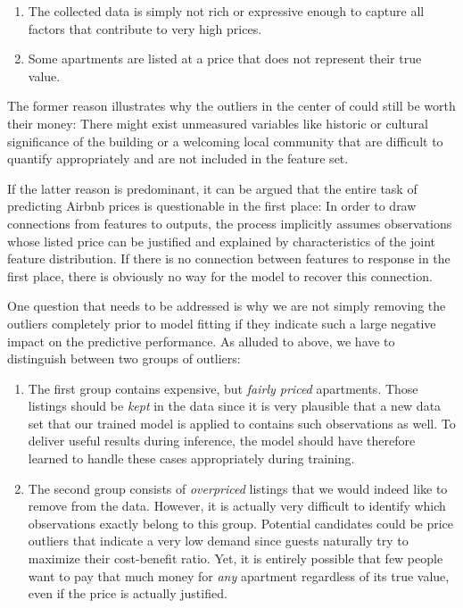 \begin{enumerate}
  \item The collected data is simply not rich or expressive enough to capture all factors that contribute to very high prices.
  \item Some apartments are listed at a price that does not represent their true value.
\end{enumerate}


The former reason illustrates why the outliers in the center of  could still be worth their money:
There might exist unmeasured variables like historic or cultural significance of the building or a welcoming local community that are difficult to quantify appropriately and are not included in the feature set.

If the latter reason is predominant, it can be argued that the entire task of predicting Airbnb prices is questionable in the first place:
In order to draw connections from features to outputs, the process implicitly assumes observations whose listed price can be justified and explained by characteristics of the joint feature distribution.
If there is no connection between features to response in the first place, there is obviously no way for the model to recover this connection.

One question that needs to be addressed is why we are not simply removing the outliers completely prior to model fitting if they indicate such a large negative impact on the predictive performance.
As alluded to above, we have to distinguish between two groups of outliers:

\begin{enumerate}
  \item The first group contains expensive, but \emph{fairly priced} apartments.
        Those listings should be \emph{kept} in the data since it is very plausible that a new data set that our trained model is applied to contains such observations as well.
        To deliver useful results during inference, the model should have therefore learned to handle these cases appropriately during training.
  \item The second group consists of \emph{overpriced} listings that we would indeed like to remove from the data.
        However, it is actually very difficult to identify which observations exactly belong to this group.
        Potential candidates could be price outliers that indicate a very low demand since guests naturally try to maximize their cost-benefit ratio.
        Yet, it is entirely possible that few people want to pay that much money for \emph{any} apartment regardless of its true value, even if the price is actually justified.
\end{enumerate}

